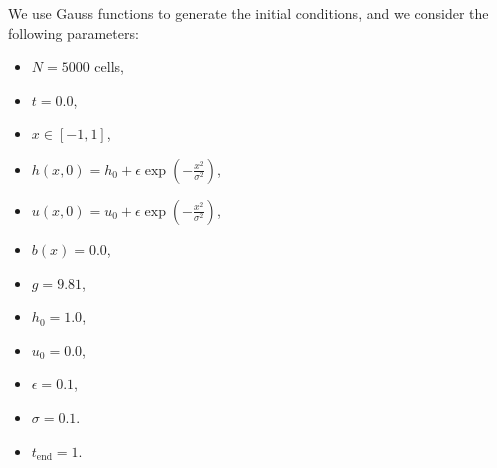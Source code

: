 We use Gauss functions to generate the initial conditions, and we consider the following parameters:
\begin{itemize}
    \item $N = 5000$ cells,
    \item $t = 0.0$,
    \item $x \in [-1, 1]$,
    \item $h(x,0) = h_0 + \epsilon \exp\left(-\frac{x^2}{\sigma^2}\right)$,
    \item $u(x,0) = u_0 + \epsilon \exp\left(-\frac{x^2}{\sigma^2}\right)$,
    \item $b(x) = 0.0$,
    \item $g = 9.81$,
    \item $h_0 = 1.0$,
    \item $u_0 = 0.0$,
    \item $\epsilon = 0.1$,
    \item $\sigma = 0.1$.
    \item $t_{\text{end}} = 1$.
\end{itemize}




